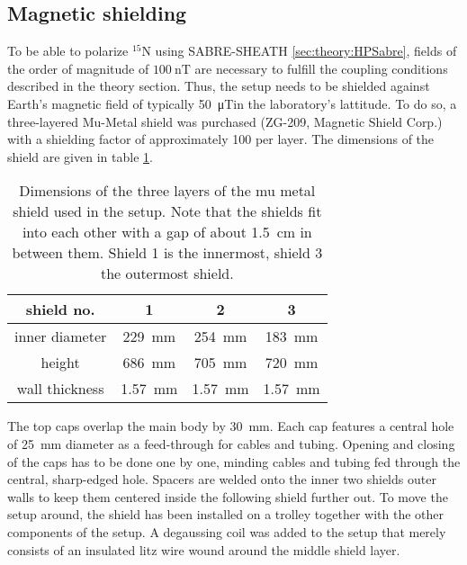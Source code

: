         \subsection{Magnetic shielding}
        To be able to polarize $^{15}\mathrm{N}$ using SABRE-SHEATH \ref{sec:theory:HPSabre}, fields of the order of magnitude of $\SI{100}{\nano\tesla}$ are necessary to fulfill the coupling conditions described in the theory section. Thus, the setup needs to be shielded against Earth's magnetic field of typically \SI{50}{\micro\tesla}in the laboratory's lattitude. To do so, a three-layered Mu-Metal shield was purchased (ZG-209, Magnetic Shield Corp.) with a shielding factor of approximately 100 per layer. The dimensions of the shield are given in table \ref{table:matMeth:muMetalDims}.
            \begin{table}
                \centering
                \begin{tabular}{|c|ccc|}
                    \hline
                    shield no. & 1 & 2 & 3 \\
                    \hline
                    inner diameter &  \SI{229}{\mm}& \SI{254}{\mm}& \SI{183}{\mm}\\
                    height & \SI{686}{\mm}& \SI{705}{\mm}& \SI{720}\mm\\
                    wall thickness&\SI{1.57}{\mm}&\SI{1.57}{\mm}&\SI{1.57}{\mm}\\
                    \hline
                \end{tabular}
                \caption[Shield dimensions]{Dimensions of the three layers of the mu metal shield used in the setup. Note that the shields fit into each other with a gap of about \SI{1.5}{\cm} in between them. Shield 1 is the innermost, shield 3 the outermost shield.}
                \label{table:matMeth:muMetalDims}
            \end{table}
            The top caps overlap the main body by \SI{30}{\mm}.  Each cap features a central hole of \SI{25}{\mm} diameter as a feed-through for cables and tubing. Opening and closing of the caps has to be done one by one, minding cables and tubing fed through the central, sharp-edged hole. Spacers are welded onto the inner two shields outer walls to keep them centered inside the following shield further out. To move the setup around, the shield has been installed on a trolley together with the other components of the setup.  A degaussing coil was  added to the setup that merely consists of an insulated litz wire wound around the middle shield layer.
